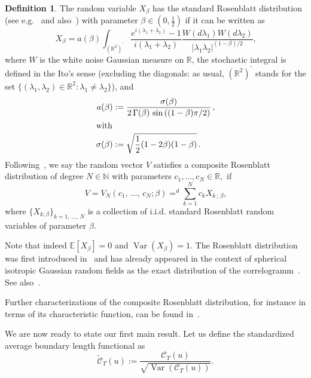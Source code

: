 \documentclass[10pt]{amsart}
\theoremstyle{definition}\newtheorem{defi}[theo]{Definition}\newtheorem{rema}[theo]{Remark}\newtheorem{exam}[theo]{Example}\newtheorem{exem}[theo]{Example}\newtheorem{nota}[theo]{Notation}
\newcommand{\clC}{\mathcal{C}}
\newcommand{\bbR}{\mathbb{R}}
\newcommand{\bbE}{\mathbb{E}}
\newcommand{\bbN}{\mathbb{N}}
\DeclareMathOperator{\Var}{Var}
\begin{document}
\begin{defi}
The random variable $X_\beta$ has the standard Rosenblatt distribution (see e.g.~\cite{Ta:75} and also~\cite{DM79,Ta:79}) with parameter $\beta \in (0,
\frac{1}{2})$ if it can be written as
\begin{equation}\label{Xbeta}
X_{\beta}=a(\beta) \int_{(\bbR^{2})^{^{\prime }}}\frac{e^{i(\lambda _{1}+\lambda _{2})}-1}{i(\lambda _{1}+\lambda _{2})}\frac{W(d\lambda _{1})W(d\lambda _{2})}{|\lambda _{1}\lambda _{2}|^{(1-\beta)/2}}\text{,}
\end{equation}
where $W$ is the white noise Gaussian measure on $\bbR$, the stochastic integral is defined in the Ito's sense (excluding the diagonals: as usual, $(\bbR^2)^{\prime }$ stands for the set $\{ (\lambda_1,
\lambda_2)\in \bbR^2:\lambda_1 \ne \lambda_2\}$), and
\begin{align}
a(\beta) &:= \frac{\sigma(\beta)}{2\,\Gamma(\beta)\,\sin\left({(1-\beta)\pi}/{ 2}\right)}\,,\label{abeta}
\\
\intertext{with}
\sigma(\beta) &:= \sqrt{\frac12(1-2\beta)(1-\beta)}\,.\nonumber
\end{align}
Following~\cite{MRV:20}, we say the random vector $V$ satisfies a composite Rosenblatt distribution of degree $N\in \bbN$ with parameters $ c_{1},\dots,c_{N}\in \bbR,$ if
\begin{equation}\label{V}
V=V_{N}(c_{1},\,\dots,\,c_{N};\beta)\mathop{=}^d\sum_{k=1}^{N}c_{k}X_{k\,;\,\beta}
\text{,}
\end{equation}
where $\{ X_{k;\beta}\} _{k=1,\,\dots,\,N}$ is a collection of i.i.d. standard Rosenblatt random variables of parameter $\beta $.
\end{defi}

Note that indeed $\bbE[X_\beta]=0$ and $\Var(X_\beta)=1$. The Rosenblatt distribution was first introduced in~\cite{Ta:75} and has already appeared in the context of spherical isotropic Gaussian random fields as the exact distribution of the correlogramm~\cite{LTT18}. See also~\cite{Leo88, LRT17,VT13}.

Further characterizations of the composite Rosenblatt distribution, for instance in terms of its characteristic function, can be found in~\cite {MRV:20}.

We are now ready to state our first main result. Let us define the standardized average boundary length functional as
\begin{equation}
\widetilde{\clC}_{T}(u):=\frac{\clC_{T}(u)}{\sqrt{\Var\left(\clC_{T}(u)\right)}}.
\end{equation}
\end{document}
